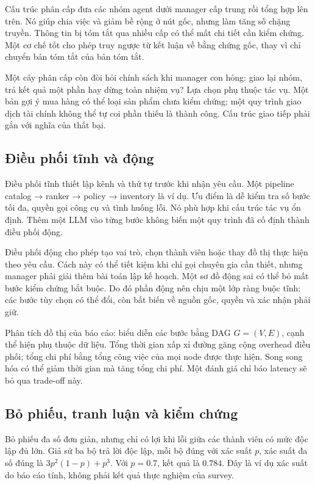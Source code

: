 Cấu trúc phân cấp đưa các nhóm agent dưới manager cấp trung rồi tổng hợp
lên trên. Nó giúp chia việc và giảm bề rộng ở nút gốc, nhưng làm tăng số
chặng truyền. Thông tin bị tóm tắt qua nhiều cấp có thể mất chi tiết cần
kiểm chứng. Một cơ chế tốt cho phép truy ngược từ kết luận về bằng chứng
gốc, thay vì chỉ chuyển bản tóm tắt của bản tóm tắt.

Một cây phân cấp còn đòi hỏi chính sách khi manager con hỏng: giao lại
nhóm, trả kết quả một phần hay dừng toàn nhiệm vụ? Lựa chọn phụ thuộc
tác vụ. Một bản gợi ý mua hàng có thể loại sản phẩm chưa kiểm chứng; một
quy trình giao dịch tài chính không thể tự coi phần thiếu là thành công.
Cấu trúc giao tiếp phải gắn với nghĩa của thất bại.

\subsection{Điều phối tĩnh và
động}\label{ux111iux1ec1u-phux1ed1i-tux129nh-vuxe0-ux111ux1ed9ng}

Điều phối tĩnh thiết lập kênh và thứ tự trước khi nhận yêu cầu. Một
pipeline catalog → ranker → policy → inventory là ví dụ. Ưu điểm là dễ
kiểm tra số bước tối đa, quyền gọi công cụ và tình huống lỗi. Nó phù hợp
khi cấu trúc tác vụ ổn định. Thêm một LLM vào từng bước không biến một
quy trình đã cố định thành điều phối động.

Điều phối động cho phép tạo vai trò, chọn thành viên hoặc thay đồ thị
thực hiện theo yêu cầu. Cách này có thể tiết kiệm khi chỉ gọi chuyên gia
cần thiết, nhưng manager phải giải thêm bài toán lập kế hoạch. Một sơ đồ
động sai có thể bỏ mất bước kiểm chứng bắt buộc. Do đó phần động nên
chịu một lớp ràng buộc tĩnh: các bước tùy chọn có thể đổi, còn bất biến
về nguồn gốc, quyền và xác nhận phải giữ.

Phân tích đồ thị của báo cáo: biểu diễn các bước bằng DAG \(G=(V,E)\),
cạnh thể hiện phụ thuộc dữ liệu. Tổng thời gian xấp xỉ đường găng cộng
overhead điều phối; tổng chi phí bằng tổng công việc của mọi node được
thực hiện. Song song hóa có thể giảm thời gian mà tăng tổng chi phí. Một
đánh giá chỉ báo latency sẽ bỏ qua trade-off này.

\subsection{Bỏ phiếu, tranh luận và kiểm
chứng}\label{bux1ecf-phiux1ebfu-tranh-luux1eadn-vuxe0-kiux1ec3m-chux1ee9ng}

Bỏ phiếu đa số đơn giản, nhưng chỉ có lợi khi lỗi giữa các thành viên có
mức độc lập đủ lớn. Giả sử ba bộ trả lời độc lập, mỗi bộ đúng với xác
suất \(p\), xác suất đa số đúng là \(3p^2(1-p)+p^3\). Với \(p=0.7\), kết
quả là \(0.784\). Đây là ví dụ xác suất do báo cáo tính, không phải kết
quả thực nghiệm của survey.


